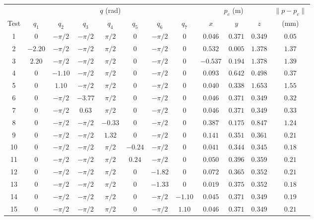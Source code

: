 \begin{table}[H]
\centering
\footnotesize
\setlength{\tabcolsep}{3pt}
\renewcommand{\arraystretch}{1.15}
\begin{tabular}{|c|ccccccc|ccc|c|}
\hline
 & \multicolumn{7}{c|}{$q$ (rad)} & \multicolumn{3}{c|}{$p_c$ (m)} & $\lVert p - p_c \rVert$ \\
Test & $q_1$ & $q_2$ & $q_3$ & $q_4$ & $q_5$ & $q_6$ & $q_7$ & $x$ & $y$ & $z$ & (mm) \\
\hline
1 & $0$ & $-\pi/2$ & $-\pi/2$ & $\pi/2$ & $0$ & $-\pi/2$ & $0$ & $0.046$ & $0.371$ & $0.349$ & $0.05$ \\
2 & $-2.20$ & $-\pi/2$ & $-\pi/2$ & $\pi/2$ & $0$ & $-\pi/2$ & $0$ & $0.532$ & $0.005$ & $1.378$ & $1.37$ \\
3 & $2.20$ & $-\pi/2$ & $-\pi/2$ & $\pi/2$ & $0$ & $-\pi/2$ & $0$ & $-0.537$ & $0.194$ & $1.378$ & $1.39$ \\
4 & $0$ & $-1.10$ & $-\pi/2$ & $\pi/2$ & $0$ & $-\pi/2$ & $0$ & $0.093$ & $0.642$ & $0.498$ & $0.37$ \\
5 & $0$ & $1.10$ & $-\pi/2$ & $\pi/2$ & $0$ & $-\pi/2$ & $0$ & $0.040$ & $0.338$ & $1.653$ & $1.55$ \\
6 & $0$ & $-\pi/2$ & $-3.77$ & $\pi/2$ & $0$ & $-\pi/2$ & $0$ & $0.046$ & $0.371$ & $0.349$ & $0.32$ \\
7 & $0$ & $-\pi/2$ & $0.63$ & $\pi/2$ & $0$ & $-\pi/2$ & $0$ & $0.046$ & $0.371$ & $0.349$ & $0.33$ \\
8 & $0$ & $-\pi/2$ & $-\pi/2$ & $-0.33$ & $0$ & $-\pi/2$ & $0$ & $0.387$ & $0.175$ & $0.847$ & $1.24$ \\
9 & $0$ & $-\pi/2$ & $-\pi/2$ & $1.32$ & $0$ & $-\pi/2$ & $0$ & $0.141$ & $0.351$ & $0.361$ & $0.21$ \\
10 & $0$ & $-\pi/2$ & $-\pi/2$ & $\pi/2$ & $-0.24$ & $-\pi/2$ & $0$ & $0.041$ & $0.344$ & $0.345$ & $0.18$ \\
11 & $0$ & $-\pi/2$ & $-\pi/2$ & $\pi/2$ & $0.24$ & $-\pi/2$ & $0$ & $0.050$ & $0.396$ & $0.359$ & $0.21$ \\
12 & $0$ & $-\pi/2$ & $-\pi/2$ & $\pi/2$ & $0$ & $-1.82$ & $0$ & $0.072$ & $0.365$ & $0.352$ & $0.21$ \\
13 & $0$ & $-\pi/2$ & $-\pi/2$ & $\pi/2$ & $0$ & $-1.33$ & $0$ & $0.019$ & $0.375$ & $0.352$ & $0.18$ \\
14 & $0$ & $-\pi/2$ & $-\pi/2$ & $\pi/2$ & $0$ & $-\pi/2$ & $-1.10$ & $0.045$ & $0.371$ & $0.349$ & $0.19$ \\
15 & $0$ & $-\pi/2$ & $-\pi/2$ & $\pi/2$ & $0$ & $-\pi/2$ & $1.10$ & $0.046$ & $0.371$ & $0.349$ & $0.21$ \\

\end{tabular}
\end{table}
